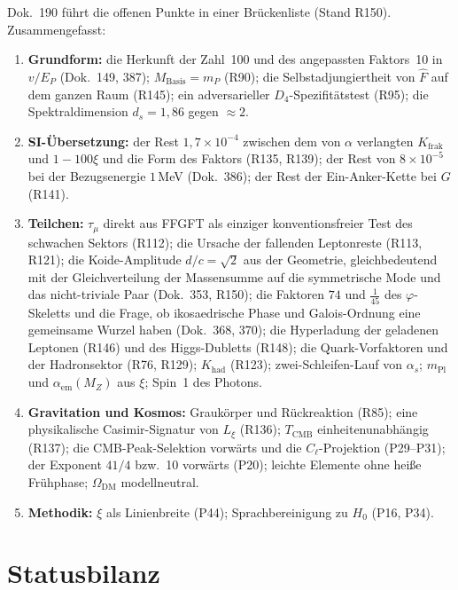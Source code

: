 Dok.~190 führt die offenen Punkte in einer Brückenliste (Stand R150). Zusammengefasst:
\begin{enumerate}[leftmargin=*,itemsep=1pt]
\item \textbf{Grundform:} die Herkunft der Zahl~100 und des angepassten Faktors~10 in $v/E_P$ (Dok.~149, 387);
  $M_{\text{Basis}}=m_P$ (R90); die Selbstadjungiertheit von $\hat F$ auf dem ganzen Raum (R145);
  ein adversarieller $D_4$-Spezifitätstest (R95); die Spektraldimension $d_s=1{,}86$ gegen
  $\approx2$.
\item \textbf{SI-Übersetzung:} der Rest $1{,}7\times10^{-4}$ zwischen dem von $\alpha$ verlangten
  $K_{\text{frak}}$ und $1-100\xi$ und die Form des Faktors (R135, R139); der Rest von
  $8\times10^{-5}$ bei der Bezugsenergie $1$\,MeV (Dok.~386); der Rest der Ein-Anker-Kette bei $G$ (R141).
\item \textbf{Teilchen:} $\tau_\mu$ direkt aus FFGFT als einziger konventionsfreier Test des schwachen
  Sektors (R112); die Ursache der fallenden Leptonreste (R113, R121); die Koide-Amplitude
  $d/c=\sqrt2$ aus der Geometrie, gleichbedeutend mit der Gleichverteilung der Massensumme auf
  die symmetrische Mode und das nicht-triviale Paar (Dok.~353, R150); die Faktoren $74$ und $\tfrac1{45}$ des $\varphi$-Skeletts und
  die Frage, ob ikosaedrische Phase und Galois-Ordnung eine gemeinsame Wurzel haben (Dok.~368,
  370); die Hyperladung der geladenen Leptonen (R146) und des Higgs-Dubletts (R148); die
  Quark-Vorfaktoren und der Hadronsektor (R76, R129); $K_{\text{had}}$ (R123); zwei-Schleifen-Lauf
  von $\alpha_s$; $m_{\text{Pl}}$ und $\alpha_{\text{em}}(M_Z)$ aus $\xi$; Spin~1 des Photons.
\item \textbf{Gravitation und Kosmos:} Graukörper und Rückreaktion (R85); eine physikalische
  Casimir-Signatur von $L_\xi$ (R136); $T_{\text{CMB}}$ einheitenunabhängig (R137); die
  CMB-Peak-Selektion vorwärts und die $C_\ell$-Projektion (P29--P31); der Exponent $41/4$ bzw.\
  10 vorwärts (P20); leichte Elemente ohne heiße Frühphase; $\Omega_{\text{DM}}$ modellneutral.
\item \textbf{Methodik:} $\xi$ als Linienbreite (P44); Sprachbereinigung zu $H_0$ (P16, P34).
\end{enumerate}

\section{Statusbilanz}

